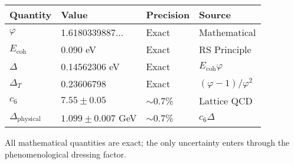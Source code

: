 \documentclass[11pt]{article}
\numberwithin{equation}{section}
\theoremstyle{remark}
\newcommand{\Ecoh}{E_{\text{coh}}}
\newcommand{\massGap}{\Delta}
\newcommand{\transferGap}{\Delta_T}
\newcommand{\phys}{\text{physical}}
\begin{document}
\begin{center}
\begin{tabular}{llll}
\toprule
Quantity & Value & Precision & Source \\
\midrule
$\varphi$ & 1.6180339887... & Exact & Mathematical \\
$\Ecoh$ & 0.090 eV & Exact & RS Principle \\
$\massGap$ & 0.14562306 eV & Exact & $\Ecoh \varphi$ \\
$\transferGap$ & 0.23606798 & Exact & $(\varphi-1)/\varphi^2$ \\
$c_6$ & $7.55 \pm 0.05$ & $\sim$0.7\% & Lattice QCD \\
$\Delta_{\phys}$ & $1.099 \pm 0.007$ GeV & $\sim$0.7\% & $c_6 \massGap$ \\
\bottomrule
\end{tabular}
\end{center}

All mathematical quantities are exact; the only uncertainty enters through the phenomenological dressing factor.
\end{document}
